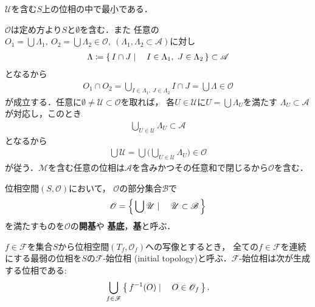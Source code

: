 	$\mathscr{U}$を含む$S$上の位相の中で最小である．
	
	\begin{prf}
		$\mathscr{O}$は定め方より$S$と$\emptyset$を含む．また
		任意の$O_1 = \bigcup \Lambda_1,\ O_2=\bigcup \Lambda_2 \in \mathscr{O},\ 
		(\Lambda_1,\Lambda_2 \subset \mathscr{A})$に対し
		\begin{align}
			\Lambda \coloneqq
			\left\{\, I \cap J \mid \quad I \in \Lambda_1,\ J \in \Lambda_2\, \right\} \subset \mathscr{A}
		\end{align}
		となるから
		\begin{align}
			O_1 \cap O_2 = \bigcup_{I \in \Lambda_1,\ J \in \Lambda_2} I \cap J
			= \bigcup \Lambda \in \mathscr{O}
		\end{align}
		が成立する．任意に$\emptyset \neq \mathscr{U} \subset \mathscr{O}$を取れば，
		各$U \in \mathscr{U}$に$U = \bigcup \Lambda_U$を満たす
		$\Lambda_U \subset \mathscr{A}$が対応し，このとき
		\begin{align}
			\bigcup_{U \in \mathscr{U}} \Lambda_U \subset \mathscr{A}
		\end{align}
		となるから
		\begin{align}
			\bigcup \mathscr{U} = \bigcup \Biggl(\bigcup_{U \in \mathscr{U}} \Lambda_U\Biggr)
			\in \mathscr{O}
		\end{align}
		が従う．$\mathscr{M}$を含む任意の位相は$\mathscr{A}$を含みかつその任意和で閉じるから$\mathscr{O}$を含む．
		\QED
	\end{prf}
	
	\begin{screen}
		\begin{dfn}[開基]
			位相空間$(S,\mathscr{O})$において，
			$\mathscr{O}$の部分集合$\mathscr{B}$で
			\begin{align}
				\mathscr{O}
				= \left\{\, \bigcup \mathscr{U} \mid \quad \mathscr{U} \subset \mathscr{B}\, \right\}
			\end{align}
			を満たすものを$\mathscr{O}$の{\bf 開基}や
			{\bf 基底}，{\bf 基}と呼ぶ．
		\end{dfn}
	\end{screen}
	
	\begin{screen}
		\begin{thm}[Alexanderの定理]
		\end{thm}
	\end{screen}
	
	\begin{screen}
		\begin{dfn}[始位相]
			$f \in \mathscr{F}$を集合$S$から位相空間$(T_f,\mathscr{O}_f)$への写像とするとき，
			全ての$f \in \mathscr{F}$を連続にする最弱の位相を$S$の$\mathscr{F}$-始位相
			(initial topology)と呼ぶ．$\mathscr{F}$-始位相は次が生成する位相である:
			\begin{align}
				\bigcup_{f \in \mathscr{F}} \left\{\, f^{-1}(O) \mid \quad O \in \mathscr{O}_f\, \right\}.
			\end{align}
		\end{dfn}
	\end{screen}
	
